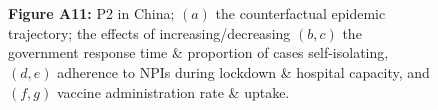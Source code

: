 \documentclass[paper=a4,fontsize=11pt]{article}
\begin{document}
\begin{figure}[!h]
  \\
  \hspace{1.76cm}
  \\
  \caption*{\textbf{Figure A11:} P2 in China; $(a)$ the counterfactual epidemic trajectory; the effects of increasing/decreasing $(b,c)$ the government response time \& proportion of cases self-isolating, $(d,e)$ adherence to NPIs during lockdown \& hospital capacity, and $(f,g)$ vaccine administration rate \& uptake.}
\end{figure}
\end{document}
